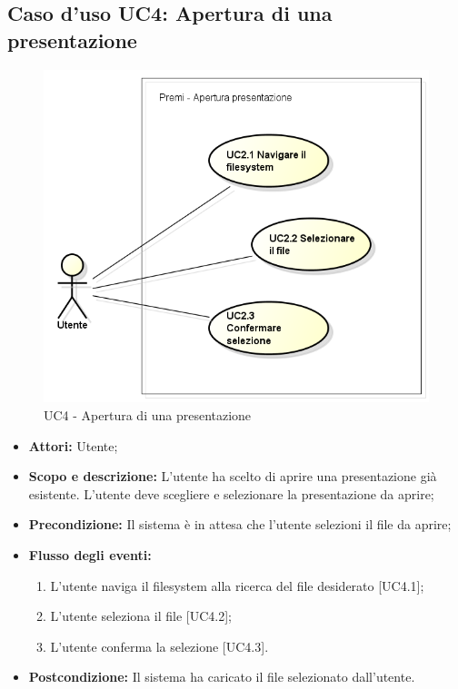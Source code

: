 \subsection{Caso d'uso UC4: Apertura di una presentazione}
\begin{figure}[h] 
	\centering 
	\includegraphics[scale=0.45] {img/UC4.png} 
	\caption{UC4 - Apertura di una presentazione} 
\end{figure}

\begin{itemize}
	\item \textbf{Attori:} Utente;
	\item \textbf{Scopo e descrizione:} L'utente ha scelto di aprire una presentazione già esistente. L'utente deve scegliere e selezionare la presentazione da aprire;
	\item \textbf{Precondizione:} Il sistema è in attesa che l'utente selezioni il file da aprire;
	\item \textbf{Flusso degli eventi:}
	\begin{enumerate}
		\item L'utente naviga il filesystem alla ricerca del file desiderato [UC4.1];
		\item L'utente seleziona il file [UC4.2];
		\item L'utente conferma la selezione [UC4.3].
	\end{enumerate}
	\item \textbf{Postcondizione:} Il sistema ha caricato il file selezionato dall'utente.
\end{itemize}

